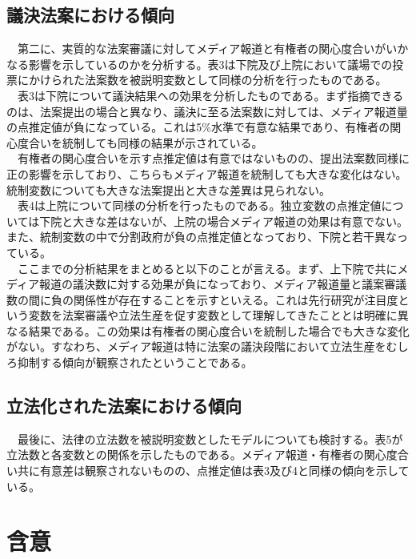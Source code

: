 \documentclass[here]{article}
\begin{document}
\subsection{議決法案における傾向}
　第二に、実質的な法案審議に対してメディア報道と有権者の関心度合いがいかなる影響を示しているのかを分析する。表3は下院及び上院において議場での投票にかけられた法案数を被説明変数として同様の分析を行ったものである。\\
　表3は下院について議決結果への効果を分析したものである。まず指摘できるのは、法案提出の場合と異なり、議決に至る法案数に対しては、メディア報道量の点推定値が負になっている。これは5\%水準で有意な結果であり、有権者の関心度合いを統制しても同様の結果が示されている。\\
　有権者の関心度合いを示す点推定値は有意ではないものの、提出法案数同様に正の影響を示しており、こちらもメディア報道を統制しても大きな変化はない。統制変数についても大きな法案提出と大きな差異は見られない。\\
　表4は上院について同様の分析を行ったものである。独立変数の点推定値については下院と大きな差はないが、上院の場合メディア報道の効果は有意でない。また、統制変数の中で分割政府が負の点推定値となっており、下院と若干異なっている。\\
　ここまでの分析結果をまとめると以下のことが言える。まず、上下院で共にメディア報道の議決数に対する効果が負になっており、メディア報道量と議案審議数の間に負の関係性が存在することを示すといえる。これは先行研究が注目度という変数を法案審議や立法生産を促す変数として理解してきたこと\citep*{Binder2003-bn,Binder2017-wr,Adler2013-ay}とは明確に異なる結果である。この効果は有権者の関心度合いを統制した場合でも大きな変化がない。すなわち、メディア報道は特に法案の議決段階において立法生産をむしろ抑制する傾向が観察されたということである。\\

\subsection{立法化された法案における傾向}
　最後に、法律の立法数を被説明変数としたモデルについても検討する。表5が立法数と各変数との関係を示したものである。メディア報道・有権者の関心度合い共に有意差は観察されないものの、点推定値は表3及び4と同様の傾向を示している。\\



\section{含意}

\newpage

\end{document}
